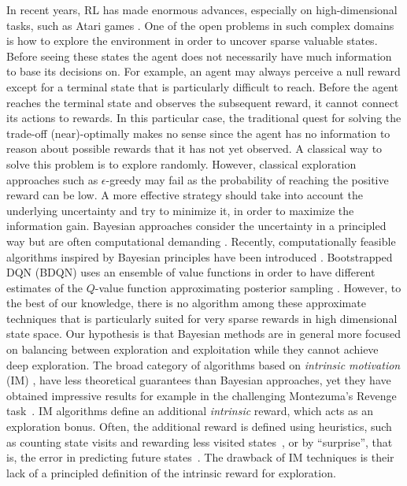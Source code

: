 In recent years, RL has made enormous advances, especially on
high-dimensional tasks, such as Atari games \cite{mnih2015human}. One
of the open problems in such complex domains is how to explore the environment in
order to uncover sparse valuable states. Before seeing these states
the agent does not necessarily have much information to base its
decisions on. %
For example, an agent may always perceive a null reward except for a
terminal state that is particularly difficult to reach. Before the
agent reaches the terminal state and observes the subsequent reward, it cannot connect its actions to
rewards. In this particular case, the traditional quest for solving the
 trade-off (near)-optimally makes no
sense since the agent has no information to reason about possible
rewards that it has not yet observed. A classical way to solve this
problem is to explore randomly. However, classical exploration
approaches such as $\epsilon$-greedy may fail as the probability of
reaching the positive reward can be low. A more effective strategy
should take into account the underlying uncertainty and try to
minimize it, in order to maximize the information gain. Bayesian approaches consider the uncertainty
in a principled way but are often
computational demanding \cite{vlassis2012bayesian,engel2005reinforcement}. Recently, computationally feasible
algorithms inspired by Bayesian principles have been
introduced \cite{azizzadenesheli2517efficient,osband2016deep}.
Bootstrapped DQN (BDQN) \cite{osband2016deep} uses an ensemble of
value functions in order to have different estimates of the $Q$-value
function approximating posterior sampling
\cite{strens2000bayesian}. However, to the best of our knowledge,
there is no algorithm among these approximate techniques that is particularly suited for very sparse rewards in high dimensional state space. Our hypothesis is that Bayesian methods are
in general more focused on balancing between exploration and
exploitation while they cannot achieve deep exploration.  The broad
category of algorithms based on \textsl{intrinsic motivation} (IM)
\cite{singh2004intrinsically}, have less theoretical guarantees
than Bayesian approaches, yet they have obtained impressive results
for example in the challenging Montezuma's Revenge task~\cite{bellemare2016unifying}. IM
algorithms define an additional \textsl{intrinsic} reward, which acts as an exploration bonus. Often, the additional
reward is defined using heuristics, such as counting state visits and
rewarding less visited states~\cite{ostrovski2017count}, or by
``surprise'', that is, the error in predicting future
states~\cite{pathak2017curiosity}. The drawback of IM techniques is
their lack of a principled definition of the intrinsic reward for exploration.

